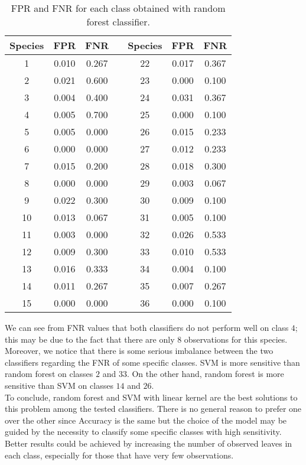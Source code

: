 \documentclass{article}
\begin{document}
\begin{table}[h]
\begin{minipage}[]{7cm}
\begin{adjustwidth}{-3cm}{}
\end{adjustwidth}
\end{minipage}
\hfill
\begin{minipage}[]{7cm}
\begin{tabular}{ |c|c|c|c|c|c|c| } \hline
Species & FPR & FNR & & Species & FPR & FNR \\
\hline
1 & 0.010 & 0.267 & & 22 & 0.017 & 0.367 \\ 
\hline
2 & 0.021 & 0.600 & & 23 & 0.000 & 0.100\\ 
\hline
 3 & 0.004 & 0.400 & & 24 & 0.031 & 0.367 \\ 
\hline
 4 & 0.005 & 0.700 & & 25 & 0.000 & 0.100\\ 
\hline
 5 &  0.005 & 0.000 & & 26 & 0.015 & 0.233 \\ 
\hline
 6 & 0.000 & 0.000 & & 27 & 0.012 & 0.233 \\ 
\hline
 7 & 0.015 & 0.200 & & 28 & 0.018 & 0.300\\ 
\hline
 8 & 0.000 & 0.000 & & 29 & 0.003 & 0.067\\ 
\hline
 9 & 0.022 & 0.300 & & 30 & 0.009& 0.100\\ 
\hline
 10 & 0.013 & 0.067 & & 31 &  0.005 & 0.100\\ 
\hline
 11 & 0.003 & 0.000 & & 32 & 0.026 & 0.533\\ 
\hline
 12 & 0.009 & 0.300 & & 33 & 0.010 & 0.533\\ 
\hline
 13 & 0.016 & 0.333 & & 34 & 0.004 & 0.100\\ 
\hline
 14 & 0.011 & 0.267 & & 35 & 0.007 & 0.267\\ 
\hline
 15 & 0.000 & 0.000 & & 36 & 0.000 & 0.100\\ 
\hline
\end{tabular}
\caption{FPR and FNR for each class obtained with random forest classifier.}\label{table4}
\end{minipage}

\end{table}

We can see from FNR values that both classifiers do not perform well on class $4$; this may be due to the fact that there are only $8$ observations for this species. Moreover, we notice that there is some serious imbalance between the two classifiers regarding the FNR of some specific classes. SVM is more sensitive than random forest on classes $2$ and $33$. On the other hand, random forest is more sensitive than SVM on classes $14$ and $26$. 
\\To conclude, random forest and SVM with linear kernel are the best solutions to this problem among the tested classifiers. There is no general reason to prefer one over the other since Accuracy is the same but the choice of the model may be guided by the necessity to classify some specific classes with high sensitivity.
\\Better results could be achieved by increasing the number of observed leaves in each class, especially for those that have very few observations.


\newpage


\end{document}
